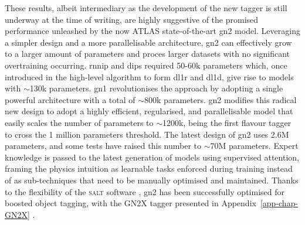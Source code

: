 These results, albeit intermediary as the development of the new tagger is still underway at the time of writing, are highly suggestive of the promised performance unleashed by the now ATLAS state-of-the-art \gls{gn2} model. Leveraging a simpler design and a more parallelisable architecture, \gls{gn2} can effectively grow to a larger amount of parameters and proces larger datasets with no significant overtraining occurring. \gls{rnnip} and \gls{dips} required 50-60k parameters which, once introduced in the high-level algorithm to form \gls{dl1r} and \gls{dl1d}, give rise to models with $\sim$130k parameters. \gls{gn1} revolutionises the approach by adopting a single powerful architecture with a total of $\sim$800k parameters. \gls{gn2} modifies this radical new design to adopt a highly efficient, regularised, and parallelisable model that easily scales the number of parameters to $\sim$1200k, being the first flavour tagger to cross the 1 million parameters threshold. The latest design of \gls{gn2} uses 2.6M parameters, and some tests have raised this number to $\sim$70M parameters. Expert knowledge is passed to the latest generation of models using supervised attention, framing the physics intuition as learnable tasks enforced during training instead of as sub-techniques that need to be manually optimised and maintained. Thanks to the flexibility of the \textsc{salt} software \cite{SaltCite}, \gls{gn2} has been successfully optimised for boosted object tagging, with the GN2X tagger presented in Appendix~\ref{app-chap-GN2X} \cite{ATL-PHYS-PUB-2023-021}.
